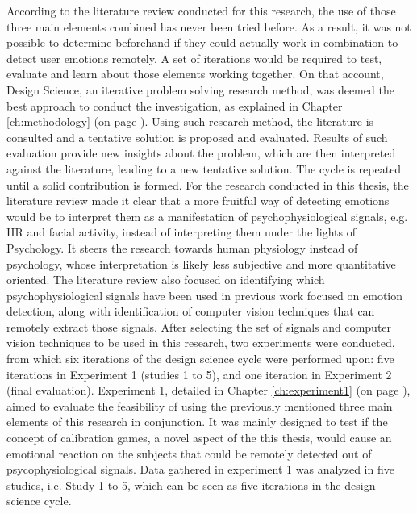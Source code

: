 According to the literature review conducted for this research, the use of those three main elements combined has never been tried before. As a result, it was not possible to determine beforehand if they could actually work in combination to detect user emotions remotely. A set of iterations would be required to test, evaluate and learn about those elements working together. On that account, Design Science, an iterative problem solving research method, was deemed the best approach to conduct the investigation, as explained in Chapter \ref{ch:methodology} (on page \pageref{ch:methodology}). Using such research method, the literature is consulted and a tentative solution is proposed and evaluated. Results of such evaluation provide new insights about the problem, which are then interpreted against the literature, leading to a new tentative solution. The cycle is repeated until a solid contribution is formed. For the research conducted in this thesis, the literature review made it clear that a more fruitful way of detecting emotions would be to interpret them as a manifestation of psychophysiological signals, e.g. HR and facial activity, instead of interpreting them under the lights of Psychology. It steers the research towards human physiology instead of psychology, whose interpretation is likely less subjective and more quantitative oriented. The literature review also focused on identifying which psychophysiological signals have been used in previous work focused on emotion detection, along with identification of computer vision techniques that can remotely extract those signals. After selecting the set of signals and computer vision techniques to be used in this research, two experiments were conducted, from which six iterations of the design science cycle were performed upon: five iterations in Experiment 1 (studies 1 to 5), and one iteration in Experiment 2 (final evaluation). Experiment 1, detailed in Chapter \ref{ch:experiment1} (on page \pageref{ch:experiment1}), aimed to evaluate the feasibility of using the previously mentioned three main elements of this research in conjunction. It was mainly designed to test if the concept of calibration games, a novel aspect of the this thesis, would cause an emotional reaction on the subjects that could be remotely detected out of psycophysiological signals. Data gathered in experiment 1 was analyzed in five studies, i.e. Study 1 to 5, which can be seen as five iterations in the design science cycle.

